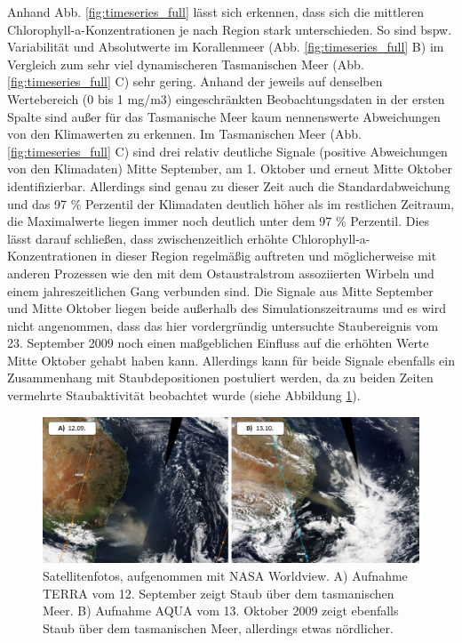 \documentclass[12pt,a4paper,onecolumn]{scrartcl}
\begin{document}
Anhand Abb. \ref{fig:timeseries_full} lässt sich erkennen, dass sich die mittleren Chlorophyll-a-Konzentrationen je nach Region stark unterschieden. So sind bspw. Variabilität und Absolutwerte im Korallenmeer (Abb. \ref{fig:timeseries_full} B) im Vergleich zum sehr viel dynamischeren Tasmanischen Meer (Abb. \ref{fig:timeseries_full} C) sehr gering. Anhand der jeweils auf denselben Wertebereich (0 bis 1 mg/m3) eingeschränkten Beobachtungsdaten in der ersten Spalte sind außer für das Tasmanische Meer kaum nennenswerte Abweichungen von den Klimawerten zu erkennen. Im Tasmanischen Meer (Abb. \ref{fig:timeseries_full} C) sind drei relativ deutliche Signale (positive Abweichungen von den Klimadaten) Mitte September, am 1. Oktober und erneut Mitte Oktober identifizierbar. Allerdings sind genau zu dieser Zeit auch die Standardabweichung und das 97 \% Perzentil der Klimadaten deutlich höher als im restlichen Zeitraum, die Maximalwerte liegen immer noch deutlich unter dem 97 \% Perzentil. Dies lässt darauf schließen, dass zwischenzeitlich erhöhte Chlorophyll-a-Konzentrationen in dieser Region regelmäßig auftreten und möglicherweise mit anderen Prozessen wie den mit dem Ostaustralstrom assoziierten Wirbeln und einem jahreszeitlichen Gang \citep{Tilburg.2002} verbunden sind. Die Signale aus Mitte September und Mitte Oktober liegen beide außerhalb des Simulationszeitraums und es wird nicht angenommen, dass das hier vordergründig untersuchte Staubereignis vom 23. September 2009 noch einen maßgeblichen Einfluss auf die erhöhten Werte Mitte Oktober gehabt haben kann. Allerdings kann für beide Signale ebenfalls ein Zusammenhang mit Staubdepositionen postuliert werden, da zu beiden Zeiten vermehrte Staubaktivität beobachtet wurde (siehe Abbildung \ref{fig:duststorms_surrounding}). 
\begin{figure}
\includegraphics[width=\textwidth]{bilder/duststorms_surround.png}
\caption{Satellitenfotos, aufgenommen mit NASA Worldview. A) Aufnahme TERRA vom 12. September zeigt Staub über dem tasmanischen Meer. B) Aufnahme AQUA vom 13. Oktober 2009 zeigt ebenfalls Staub über dem tasmanischen Meer, allerdings etwas nördlicher. } \label{fig:duststorms_surrounding}
\end{figure}
\end{document}
